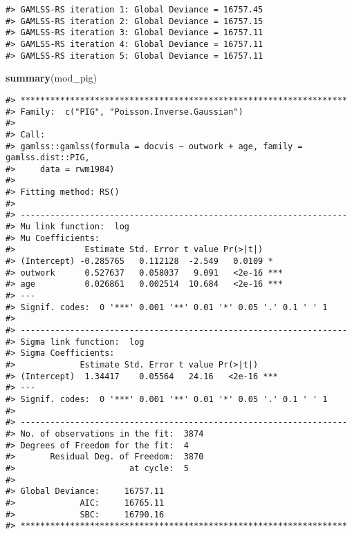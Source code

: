 \documentclass[ngerman,a4paper,]{scrartcl}
\newenvironment{Shaded}{\begin{snugshade}}{\end{snugshade}}
\newcommand{\DataTypeTok}[1]{\textcolor[rgb]{0.13,0.29,0.53}{#1}}
\newcommand{\KeywordTok}[1]{\textcolor[rgb]{0.13,0.29,0.53}{\textbf{#1}}}
\newcommand{\NormalTok}[1]{#1}
\newcommand{\OperatorTok}[1]{\textcolor[rgb]{0.81,0.36,0.00}{\textbf{#1}}}
\newcommand{\StringTok}[1]{\textcolor[rgb]{0.31,0.60,0.02}{#1}}
\theoremstyle{definition}
\theoremstyle{definition}
\theoremstyle{definition}
\theoremstyle{remark}
\begin{document}
\begin{verbatim}
#> GAMLSS-RS iteration 1: Global Deviance = 16757.45 
#> GAMLSS-RS iteration 2: Global Deviance = 16757.15 
#> GAMLSS-RS iteration 3: Global Deviance = 16757.11 
#> GAMLSS-RS iteration 4: Global Deviance = 16757.11 
#> GAMLSS-RS iteration 5: Global Deviance = 16757.11
\end{verbatim}

\begin{Shaded}
\begin{Highlighting}[]
\KeywordTok{summary}\NormalTok{(mod_pig)}
\end{Highlighting}
\end{Shaded}

\begin{verbatim}
#> ******************************************************************
#> Family:  c("PIG", "Poisson.Inverse.Gaussian") 
#> 
#> Call:  
#> gamlss::gamlss(formula = docvis ~ outwork + age, family = gamlss.dist::PIG,  
#>     data = rwm1984) 
#> 
#> Fitting method: RS() 
#> 
#> ------------------------------------------------------------------
#> Mu link function:  log
#> Mu Coefficients:
#>              Estimate Std. Error t value Pr(>|t|)    
#> (Intercept) -0.285765   0.112128  -2.549   0.0109 *  
#> outwork      0.527637   0.058037   9.091   <2e-16 ***
#> age          0.026861   0.002514  10.684   <2e-16 ***
#> ---
#> Signif. codes:  0 '***' 0.001 '**' 0.01 '*' 0.05 '.' 0.1 ' ' 1
#> 
#> ------------------------------------------------------------------
#> Sigma link function:  log
#> Sigma Coefficients:
#>             Estimate Std. Error t value Pr(>|t|)    
#> (Intercept)  1.34417    0.05564   24.16   <2e-16 ***
#> ---
#> Signif. codes:  0 '***' 0.001 '**' 0.01 '*' 0.05 '.' 0.1 ' ' 1
#> 
#> ------------------------------------------------------------------
#> No. of observations in the fit:  3874 
#> Degrees of Freedom for the fit:  4
#>       Residual Deg. of Freedom:  3870 
#>                       at cycle:  5 
#>  
#> Global Deviance:     16757.11 
#>             AIC:     16765.11 
#>             SBC:     16790.16 
#> ******************************************************************
\end{verbatim}

\begin{Shaded}
\end{Shaded}
\end{document}
